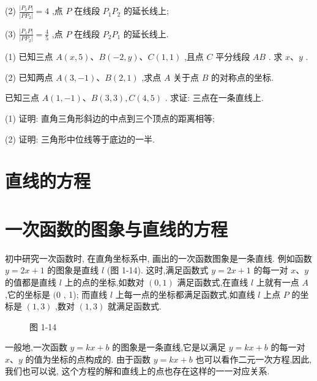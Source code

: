 \documentclass[lang=cn,newtx,10.5pt,scheme=chinese]{elegantbook}
\begin{document}
\begin{problemset}[习 题 一]
(2) \(\frac{\left| {P}_{1}P\right| }{\left| P{P}_{2}\right| } = 4\) ,点 \(P\) 在线段 \({P}_{1}{P}_{2}\) 的延长线上;

(3) \(\frac{\left| {P}_{1}P\right| }{\left| P{P}_{2}\right| } = \frac{4}{5}\) ,点 \(P\) 在线段 \({P}_{2}{P}_{1}\) 的延长线上.

\item (1) 已知三点 \(A\left( {x,5}\right) \text{、}B\left( {-2,y}\right) \text{、}C\left( {1,1}\right)\) ,且点 \(C\) 平分线段 \({AB}\) . 求 \(x\text{、}y\) .

(2) 已知两点 \(A\left( {3, - 1}\right) \text{、}B\left( {2,1}\right)\) ,求点 \(A\) 关于点 \(B\) 的对称点的坐标.

\item 已知三点 \(A\left( {1, - 1}\right) \text{、}B\left( {3,3}\right) ,C\left( {4,5}\right)\) . 求证: 三点在一条直线上.

\item (1) 证明: 直角三角形斜边的中点到三个顶点的距离相等;

(2) 证明: 三角形中位线等于底边的一半.
\end{problemset}

\section*{直线的方程}

\section{一次函数的图象与直线的方程}

初中研究一次函数时, 在直角坐标系中, 画出的一次函数图象是一条直线. 例如函数 \(y = {2x} + 1\) 的图象是直线 \(l\) (图 1-14). 这时,满足函数式 \(y = {2x} + 1\) 的每一对 \(x\text{、}y\) 的值都是直线 \(l\) 上的点的坐标,如数对 \(\left( {0,1}\right)\) 满足函数式,在直线 \(l\) 上就有一点 \(A\) ,它的坐标是 \((0\) , 1); 而直线 \(l\) 上每一点的坐标都满足函数式,如直线 \(l\) 上点 \(P\) 的坐标是 \(\left( {1,3}\right)\) ,数对 \(\left( {1,3}\right)\) 就满足函数式.

\begin{figure}[h]
  \centering
  
  \caption{图 1-14}
\end{figure}

一般地,一次函数 \(y = {kx} + b\) 的图象是一条直线,它是以满足 \(y = {kx} + b\) 的每一对 \(x\text{、}y\) 的值为坐标的点构成的. 由于函数 \(y = {kx} + b\) 也可以看作二元一次方程,因此,我们也可以说, 这个方程的解和直线上的点也存在这样的一一对应关系.
\end{document}

